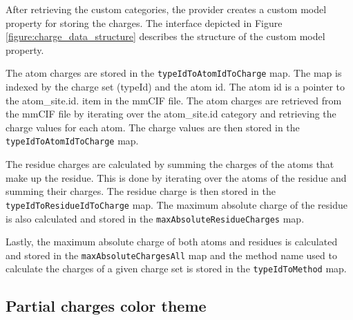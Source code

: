 \documentclass[
  digital,     %
  oneside,     %
  nosansbold,  %
  nocolorbold, %
  lof,         %
  lot,         %
]{fithesis4}
\begin{document}
After retrieving the custom categories, the provider creates a custom model property for storing the charges. The interface depicted in Figure \ref{figure:charge_data_structure} describes the structure of the custom model property.


The atom charges are stored in the \texttt{typeIdToAtomIdToCharge} map. The map is indexed by the charge set (typeId) and the atom id. The atom id is a pointer to the atom\_site.id. item in the mmCIF file. The atom charges are retrieved from the mmCIF file by iterating over the atom\_site.id category and retrieving the charge values for each atom. The charge values are then stored in the \\ \texttt{typeIdToAtomIdToCharge} map.

The residue charges are calculated by summing the charges of the atoms that make up the residue. This is done by iterating over the atoms of the residue and summing their charges. The residue charge is then stored in the \texttt{typeIdToResidueIdToCharge} map. The maximum absolute charge of the residue is also calculated and stored in the \texttt{maxAbsoluteResidueCharges} map.

Lastly, the maximum absolute charge of both atoms and residues is calculated and stored in the \texttt{maxAbsoluteChargesAll} map and the method name used to calculate the charges of a given charge set is stored in the \texttt{typeIdToMethod} map.

\subsection{Partial charges color theme}
\label{subsection:partial_charges_color_theme}
\end{document}
